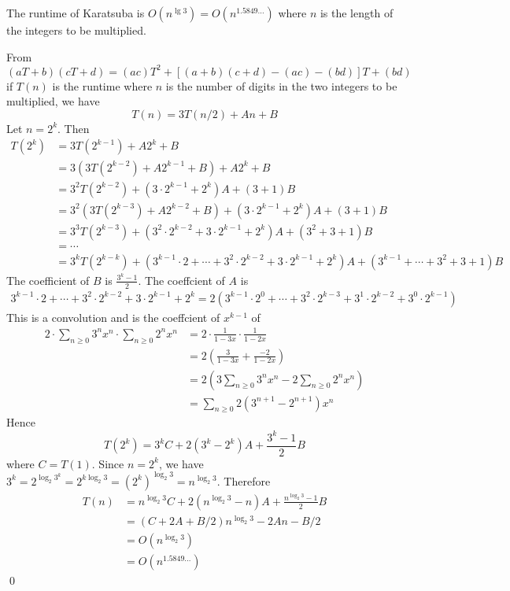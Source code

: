 \begin{prop}
  The runtime of Karatsuba is $O(n^{\lg 3}) = O(n^{1.5849...})$
  where $n$ is the length of the integers to be multiplied.
\end{prop}
\proof
From
\[
(aT + b)(cT + d) = (ac)T^2 + [(a+b)(c+d) - (ac) - (bd)]T + (bd)
\]
if $T(n)$ is the runtime where $n$ is the number of digits in the
two integers to be multiplied, we have
\[
T(n) = 3T(n/2) + An + B
\]
Let $n = 2^k$. Then
\begin{align*}
  T(2^k)
  &= 3T(2^{k-1}) + A2^k + B \\
  &= 3(3T(2^{k-2}) + A2^{k-1} + B) + A2^k + B \\
  &= 3^2T(2^{k-2}) + (3\cdot 2^{k-1} + 2^k)A + (3 + 1)B \\
  &= 3^2(3T(2^{k-3}) + A2^{k-2} + B) + (3\cdot 2^{k-1} + 2^k)A + (3 + 1)B \\
  &= 3^3T(2^{k-3}) + (3^2\cdot 2^{k-2} + 3\cdot 2^{k-1} + 2^k)A + (3^2 + 3 + 1)B \\
  &= \cdots \\
  &= 3^kT(2^{k-k})
  + (3^{k-1}\cdot 2 + \cdots + 3^2\cdot 2^{k-2} + 3\cdot 2^{k-1} + 2^k)A
  + (3^{k-1} + \cdots + 3^2 + 3 + 1)B 
\end{align*}
The coefficient of $B$ is $\displaystyle \frac{3^k - 1}{2}$.
The coeffcient of $A$ is
\begin{align*}
  3^{k-1}\cdot 2 + \cdots + 3^2\cdot 2^{k-2} + 3\cdot 2^{k-1} + 2^k
  =
  2 ( 3^{k-1}\cdot 2^0 + \cdots + 3^2\cdot 2^{k-3} + 3^1\cdot 2^{k-2} + 3^0 \cdot 2^{k-1} )
\end{align*}
This is a convolution and is the coeffcient of $x^{k - 1}$ of
\begin{align*}
  2 \cdot \sum_{n \geq 0} 3^n x^n \cdot \sum_{n \geq 0} 2^n x^n
  &=
  2 \cdot \frac{1}{1 - 3x} \cdot \frac{1}{1 - 2x} \\
  &=
  2 \left( \frac{3}{1 - 3x} + \frac{-2}{1 - 2x} \right)\\
  &=
  2 \left( 3 \sum_{n \geq 0} 3^n x^n -2 \sum_{n \geq 0} 2^n x^n \right) \\
  &=
  \sum_{n \geq 0} 2(3^{n+1} - 2^{n+1}) x^n 
\end{align*}
Hence
\[
T(2^k) = 3^k C + 2(3^k - 2^k) A + \frac{3^k - 1}{2} B
\]
where $C = T(1)$.
Since $n = 2^k$, we have
$3^k = 2^{\log_2 3^k} = 2^{k \log_2 3} = (2^k)^{\log_2 3} = n^{\log_2 3}$.
Therefore
\begin{align*}
  T(n)
  &= n^{\log_2 3} C + 2(n^{\log_2 3} - n) A + \frac{n^{\log_2 3} - 1}{2} B \\
  &= (C + 2A + B/2) n^{\log_2 3} - 2A n - B/2 \\
  &= O(n^{\log_2 3}) \\
  &= O(n^{1.5849...})
\end{align*}
\qed

